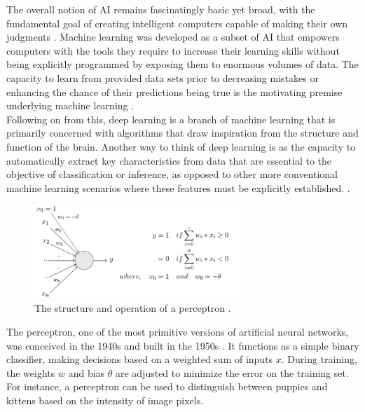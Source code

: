 \noindent The overall notion of AI remains fascinatingly basic yet broad, with the fundamental goal of creating intelligent computers capable of making their own judgments \cite{widrow199030}. Machine learning was developed as a subset of AI that empowers computers with the tools they require to increase their learning skills without being explicitly programmed by exposing them to enormous volumes of data. The capacity to learn from provided data sets prior to decreasing mistakes or enhancing the chance of their predictions being true is the motivating premise underlying machine learning \cite{jain1996artificial}. \\

\noindent Following on from this, deep learning is a branch of machine learning that is primarily concerned with algorithms that draw inspiration from the structure and function of the brain. Another way to think of deep learning is as the capacity to automatically extract key characteristics from data that are essential to the objective of classification or inference, as opposed to other more conventional machine learning scenarios where these features must be explicitly established. \cite{zhao2003face}. \\

\begin{figure}[htbp!] 
\centering    
\includegraphics[width=0.7\textwidth]{Chapter1/Figs/1g.png}
\caption[The structure and operation of a perceptron.]{The structure and operation of a perceptron \cite{marvin1969perceptrons}.}
\label{fig:1g}
\end{figure}

\noindent The perceptron, one of the most primitive versions of artificial neural networks, was conceived in the 1940s \cite{mcculloch1943logical} and built in the 1950s \cite{rosenblatt1957perceptron}. It functions as a simple binary classifier, making decisions based on a weighted sum of inputs $x$. During training, the weights $w$ and bias $\theta$ are adjusted to minimize the error on the training set. For instance, a perceptron can be used to distinguish between puppies and kittens based on the intensity of image pixels. \\

